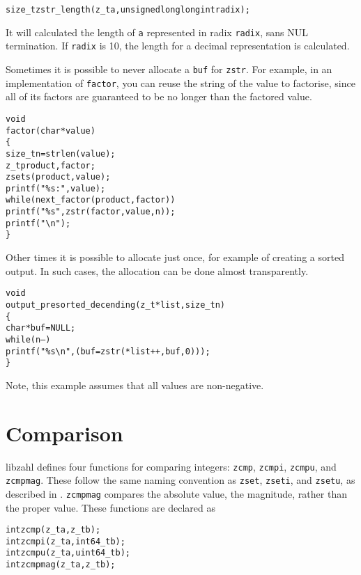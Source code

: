 \begin{alltt}
   size_t zstr_length(z_t a, unsigned long long int radix);
\end{alltt}

\noindent
It will calculated the length of {\tt a} represented
in radix {\tt radix}, sans NUL termination. If
{\tt radix} is 10, the length for a decimal
representation is calculated.

Sometimes it is possible to never allocate a {\tt buf}
for {\tt zstr}. For example, in an implementation
of {\tt factor}, you can reuse the string of the
value to factorise, since all of its factors are
guaranteed to be no longer than the factored value.

\begin{alltt}
   void
   factor(char *value)
   \{
       size_t n = strlen(value);
       z_t product, factor;
       zsets(product, value);
       printf("\%s:", value);
       while (next_factor(product, factor))
           printf(" \%s", zstr(factor, value, n));
       printf("\verb|\|n");
   \}
\end{alltt}

Other times it is possible to allocate just
once, for example of creating a sorted output.
In such cases, the allocation can be done almost
transparently.

\begin{alltt}
   void
   output_presorted_decending(z_t *list, size_t n)
   \{
       char *buf = NULL;
       while (n--)
           printf("\%s\verb|\|n", (buf = zstr(*list++, buf, 0)));
   \}
\end{alltt}

\noindent
Note, this example assumes that all values are
non-negative.



\newpage
\section{Comparison}
\label{sec:Comparison}

libzahl defines four functions for comparing
integers: {\tt zcmp}, {\tt zcmpi}, {\tt zcmpu},
and {\tt zcmpmag}. These follow the same naming
convention as {\tt zset}, {\tt zseti}, and
{\tt zsetu}, as described in .
{\tt zcmpmag} compares the absolute value, the
magnitude, rather than the proper value. These
functions are declared as

\begin{alltt}
   int zcmp(z_t a, z_t b);
   int zcmpi(z_t a, int64_t b);
   int zcmpu(z_t a, uint64_t b);
   int zcmpmag(z_t a, z_t b);
\end{alltt}

